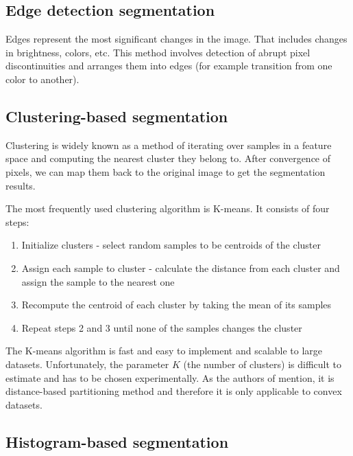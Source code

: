 \subsection{Edge detection segmentation}
\label{sec:image_segmentation:edge_based}

Edges represent the most significant changes in the image. That includes changes in
brightness, colors, etc. This method involves detection of abrupt pixel discontinuities
and arranges them into edges (for example transition from one color to another).
\cite{bib:yuheng2017image}

\subsection{Clustering-based segmentation}
\label{sec:image_segmentation:cluster_based}

Clustering is widely known as a method of iterating over samples in a feature space
and computing the nearest cluster they belong to. After convergence of pixels,
we can map them back to the original image to get the segmentation results.

The most frequently used clustering algorithm is K-means. It consists of four steps:

\begin{enumerate}
	\item Initialize clusters - select random samples to be centroids of the cluster
	\item Assign each sample to cluster - calculate the distance from each cluster and
	assign the sample to the nearest one
	\item Recompute the centroid of each cluster by taking the mean of its samples
	\item Repeat steps 2 and 3 until none of the samples changes the cluster
\end{enumerate}

The K-means algorithm is fast and easy to implement and scalable to large
datasets. Unfortunately, the parameter $K$ (the number of clusters)
is difficult to estimate and has to be chosen experimentally.
As the authors of \cite{bib:yuheng2017image} mention, it is distance-based partitioning method and
therefore it is only applicable to convex datasets.

\subsection{Histogram-based segmentation}
\label{sec:image_segmentation:histogram_based}

